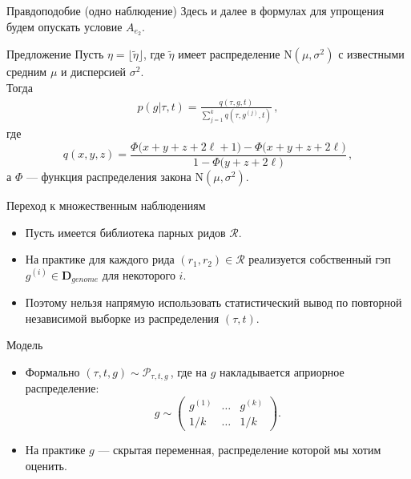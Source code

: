 \documentclass[unicode, notheorems]{beamer}
\begin{document}
\begin{frame}{Правдоподобие (одно наблюдение)}
	Здесь и далее в формулах для упрощения будем опускать условие $A_{e_2}$.
\begin{block}{Предложение}
	Пусть $\eta = \lfloor \tilde{\eta} \rfloor$, где $\tilde{\eta}$ имеет распределение $\mathrm{N}(\mu, \sigma^2)$ с известными средним $\mu$ и дисперсией $\sigma^2$.\\
	\vspace{0.2cm}
	Тогда
	\begin{equation*}
	\begin{gathered}
	p(g | \tau, t) =  \frac{q(\tau, g, t)}{\sum_{j=1}^k q(\tau, g^{(j)}, t)}	\,,
	\end{gathered}
	\end{equation*}
	где
	\begin{equation*}
	q(x, y, z)  = \frac{\Phi\big(x+y+z+2\ell+1\big) - \Phi\big(x+y+z+2\ell\big)}{1 - \Phi\big(y + z + 2\ell\big)}\,,
	\end{equation*}
	а $\Phi$ --- функция распределения закона $\mathrm{N}(\mu, \sigma^2)$.
\end{block}
\end{frame}

\begin{frame}{Переход к множественным наблюдениям}
	\begin{itemize}
		\item Пусть имеется библиотека парных ридов $\mathcal{R}$.
		\item На практике для каждого рида  $(r_1, r_2) \in \mathcal{R}$ реализуется собственный гэп $g^{(i)} \in \mathbf{D}_{genome}$ для некоторого $i$.
		\item Поэтому нельзя напрямую использовать статистический вывод по повторной независимой выборке из распределения $(\tau, t)$.
	\end{itemize}
\end{frame}

\begin{frame}{Модель}
	\begin{itemize}
		\item Формально $(\tau, t, g) \sim \mathcal{P}_{\tau, t, g}$\,, где на $g$ накладывается априорное распределение:
		\begin{equation*}
			g \sim  \begin{pmatrix} g^{(1)} & \ldots & g^{(k)} \\ 1/k & \ldots & 1/k \end{pmatrix}.
		\end{equation*}
		\item На практике $g$ --- скрытая переменная, распределение которой мы хотим оценить.
	\end{itemize}
\end{frame}
\end{document}
